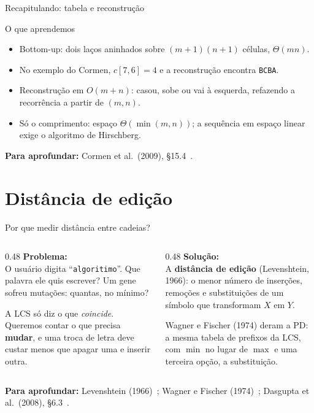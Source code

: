 \documentclass[aspectratio=169,xcolor=table]{beamer}
\newcommand{\fonte}[1]{%
  \vfill
  {\tiny\color{gray!55!black}\textbf{Para aprofundar:} #1\par}%
}
\begin{document}
\begin{frame}{Recapitulando: tabela e reconstrução}
  \begin{block}{O que aprendemos}
    \begin{itemize}\scriptsize
      \item Bottom-up: dois laços aninhados sobre $(m+1)(n+1)$ células, $\Theta(mn)$.
      \item No exemplo do Cormen, $c[7,6] = 4$ e a reconstrução encontra \texttt{BCBA}.
      \item Reconstrução em $O(m+n)$: casou, sobe ou vai à esquerda, refazendo a
            recorrência a partir de $(m,n)$.
      \item Só o comprimento: espaço $\Theta(\min(m,n))$; a sequência em espaço linear
            exige o algoritmo de Hirschberg.
    \end{itemize}
  \end{block}
  \fonte{Cormen et al.\ (2009), \S 15.4~\cite{cormen2009introduction}.}
\end{frame}

\section{Distância de edição}

\begin{frame}{Por que medir distância entre cadeias?}
  \begin{columns}[T]
    \begin{column}{0.48\textwidth}
      \textbf{Problema:}\\[2pt]
      \scriptsize O usuário digita ``\texttt{algoritimo}''. Que palavra ele quis escrever?
      Um gene sofreu mutações: quantas, no mínimo?
      \medskip

      A LCS só diz o que \emph{coincide}. Queremos contar o que precisa \textbf{mudar},
      e uma troca de letra deve custar menos que apagar uma e inserir outra.
    \end{column}
    \begin{column}{0.48\textwidth}
      \textbf{Solução:}\\[2pt]
      \scriptsize A \textbf{distância de edição} (Levenshtein, 1966): o menor número de
      inserções, remoções e substituições de um símbolo que transformam $X$ em $Y$.
      \medskip

      Wagner e Fischer (1974) deram a PD: a mesma tabela de prefixos da LCS, com $\min$
      no lugar de $\max$ e uma terceira opção, a substituição.
    \end{column}
  \end{columns}
  \fonte{Levenshtein (1966)~\cite{levenshtein1966binary};
    Wagner e Fischer (1974)~\cite{wagner1974string};
    Dasgupta et al.\ (2008), \S 6.3~\cite{dasgupta2008algorithms}.}
\end{frame}
\end{document}
